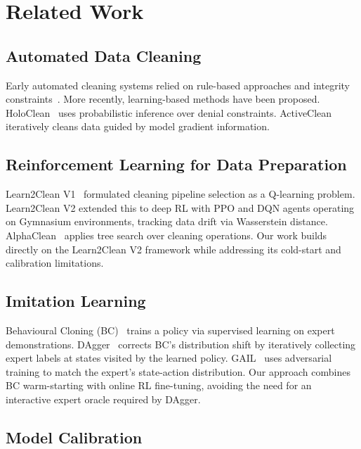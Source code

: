 \documentclass[conference]{IEEEtran}
\begin{document}
\section{Related Work}

\subsection{Automated Data Cleaning}

Early automated cleaning systems relied on rule-based approaches and
integrity constraints~\cite{fan2012foundations}. More recently,
learning-based methods have been proposed. HoloClean~\cite{rekatsinas2017holoclean}
uses probabilistic inference over denial constraints. ActiveClean~\cite{krishnan2016activeclean}
iteratively cleans data guided by model gradient information.

\subsection{Reinforcement Learning for Data Preparation}

Learn2Clean V1~\cite{berti2019learn2clean} formulated cleaning pipeline
selection as a Q-learning problem. Learn2Clean V2 extended this to deep RL
with PPO and DQN agents operating on Gymnasium environments, tracking data
drift via Wasserstein distance. AlphaClean~\cite{krishnan2019alphasearch}
applies tree search over cleaning operations. Our work builds directly on
the Learn2Clean V2 framework while addressing its cold-start and
calibration limitations.

\subsection{Imitation Learning}

Behavioural Cloning (BC)~\cite{pomerleau1991efficient} trains a policy
via supervised learning on expert demonstrations. DAgger~\cite{ross2011reduction}
corrects BC's distribution shift by iteratively collecting expert labels
at states visited by the learned policy. GAIL~\cite{ho2016generative}
uses adversarial training to match the expert's state-action distribution.
Our approach combines BC warm-starting with online RL fine-tuning, avoiding
the need for an interactive expert oracle required by DAgger.

\subsection{Model Calibration}
\end{document}
